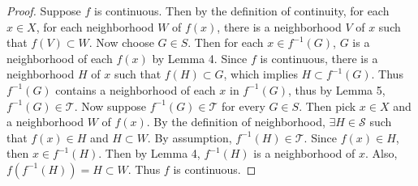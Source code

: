 \documentclass[12pt]{article}
\theoremstyle{plain}
\begin{document}
\begin{proof}
    Suppose $f$ is continuous.  Then by the definition of continuity, for each $x \in X$, for each neighborhood $W$ of $f(x)$, there is a neighborhood $V$ of $x$ such that $f(V) \subset W$.  Now choose $G \in S$.  Then for each $x \in f^{-1}(G)$, $G$ is a neighborhood of each $f(x)$ by Lemma 4.  Since $f$ is continuous, there is a neighborhood $H$ of $x$ such that $f(H) \subset G$, which implies $H \subset f^{-1}(G)$.  Thus $f^{-1}(G)$ contains a neighborhood of each $x$ in $f^{-1}(G)$, thus by Lemma 5, $f^{-1}(G) \in \mathcal{T}$.  Now suppose $f^{-1}(G) \in \mathcal{T}$ for every $G \in S$.  Then pick $x \in X$ and a neighborhood $W$ of $f(x)$.  By the definition of neighborhood, $\exists H \in \mathcal{S}$ such that $f(x) \in H$ and $H \subset W$.  By assumption, $f^{-1}(H) \in \mathcal{T}$.  Since $f(x) \in H$, then $x \in f^{-1}(H)$.  Then by Lemma 4, $f^{-1}(H)$ is a neighborhood of $x$.  Also, $f(f^{-1}(H)) = H \subset W$.  Thus $f$ is continuous.
\end{proof}
\end{document}
